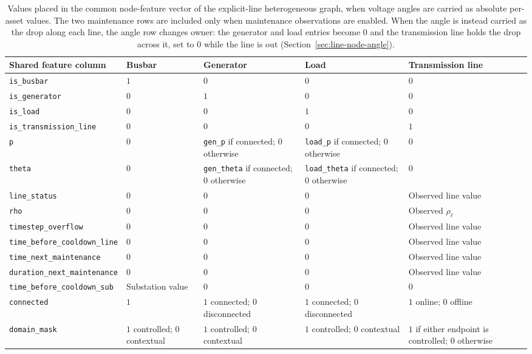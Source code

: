 \begin{table}[H]
  \centering
  \scriptsize
  \caption{Values placed in the common node-feature vector of the
  explicit-line heterogeneous graph, when voltage angles are carried as
  absolute per-asset values. The two maintenance rows are included only when
  maintenance observations are enabled. When the angle is instead carried as
  the drop along each line, the angle row changes owner: the generator and load
  entries become $0$ and the transmission line holds the drop across it, set to
  $0$ while the line is out (Section~\ref{sec:line-node-angle}).}
  \label{tab:heterogeneous-line-node-features}
  \setlength{\tabcolsep}{3pt}
  \begin{tabular}{L{0.30\textwidth}L{0.10\textwidth}L{0.14\textwidth}L{0.14\textwidth}L{0.20\textwidth}}
    \toprule
    Shared feature column & Busbar & Generator & Load & Transmission line \\
    \midrule
    \texttt{is\_busbar} & $1$ & $0$ & $0$ & $0$ \\
    \texttt{is\_generator} & $0$ & $1$ & $0$ & $0$ \\
    \texttt{is\_load} & $0$ & $0$ & $1$ & $0$ \\
    \texttt{is\_transmission\_line} & $0$ & $0$ & $0$ & $1$ \\
    \texttt{p} & $0$ & \texttt{gen\_p} if connected; $0$ otherwise & \texttt{load\_p} if connected; $0$ otherwise & $0$ \\
    \texttt{theta} & $0$ & \texttt{gen\_theta} if connected; $0$ otherwise & \texttt{load\_theta} if connected; $0$ otherwise & $0$ \\
    \texttt{line\_status} & $0$ & $0$ & $0$ & Observed line value \\
    \texttt{rho} & $0$ & $0$ & $0$ & Observed $\rho_\ell$ \\
    \texttt{timestep\_overflow} & $0$ & $0$ & $0$ & Observed line value \\
    \texttt{time\_before\_cooldown\_line} & $0$ & $0$ & $0$ & Observed line value \\
    \texttt{time\_next\_maintenance} & $0$ & $0$ & $0$ & Observed line value \\
    \texttt{duration\_next\_maintenance} & $0$ & $0$ & $0$ & Observed line value \\
    \texttt{time\_before\_cooldown\_sub} & Substation value & $0$ & $0$ & $0$ \\
    \texttt{connected} & $1$ & $1$ connected; $0$ disconnected & $1$ connected; $0$ disconnected & $1$ online; $0$ offline \\
    \texttt{domain\_mask} & $1$ controlled; $0$ contextual & $1$ controlled; $0$ contextual & $1$ controlled; $0$ contextual & $1$ if either endpoint is controlled; $0$ otherwise \\
    \bottomrule
  \end{tabular}
\end{table}


